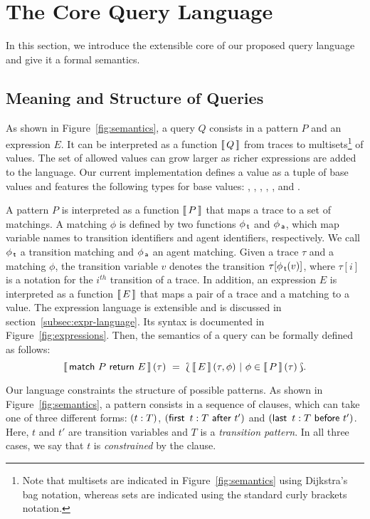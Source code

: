 \documentclass[runningheads]{llncs}
\begin{document}

\section{The Core Query Language}\label{sec:semantics}

In this section, we introduce the extensible core of our proposed
query language and give it a formal semantics.

\subsection{Meaning and Structure of Queries}\label{subsec:structure}
As shown in Figure~\ref{fig:semantics}, a query $Q$ consists in a
pattern $P$ and an expression $E$. It can be interpreted as a function
$\left\llbracket \, Q \, \right\rrbracket$ from traces to multisets\footnote{Note that multisets are
  indicated in Figure~\ref{fig:semantics} using Dijkstra's bag
  notation, whereas sets are indicated using the standard curly
  brackets notation.} of values. The set of allowed values can grow
larger as richer expressions are added to the language. Our current
implementation defines a value as a tuple of base values and features
the following types for base values: , , ,
, ,  and .

A pattern $P$ is interpreted as a function $\left\llbracket \, P \, \right\rrbracket$ that maps a trace
to a set of matchings. A matching $\phi$ is defined by two functions
$\phi_{\,\textsf{t}}$ and $\phi_{\,\textsf{a}}$, which map variable names to transition
identifiers and agent identifiers, respectively. We call $\phi_{\,\textsf{t}}$
a transition matching and $\phi_{\,\textsf{a}}$ an agent matching.  Given a
trace $\tau$ and a matching $\phi$, the transition variable $v$
denotes the transition $\tau[\phi_{\,\textsf{t}}(v)]$, where $\tau[i]$ is a
notation for the $i^{th}$ transition of a trace. In addition, an
expression $E$ is interpreted as a function $\left\llbracket \, E \, \right\rrbracket$ that maps a pair
of a trace and a matching to a value. The expression language is
extensible and is discussed in section~\ref{subsec:expr-language}. Its
syntax is documented in Figure~\ref{fig:expressions}. Then, the
semantics of a query can be formally defined as follows:
\[ \Sem{\MatchRet{\TracePat}{E}}(\tau) \ = \ \BagC{\Sem{E}(\tau,
    \phi)}{\phi \in \Sem{\TracePat}(\tau) }.  \]

Our language constraints the structure of possible patterns.  As shown
in Figure~\ref{fig:semantics}, a pattern consists in a sequence of
clauses, which can take one of three different forms: $(t:T)$,
$(\textsf{first} \,\ t:T \ \textsf{after} \ t')$ and
$(\textsf{last} \,\ t:T \ \textsf{before} \ t')$. Here, $t$ and $t'$ are transition
variables and $T$ is a \emph{transition pattern}. In all three cases,
we say that $t$ is \emph{constrained} by the clause.
\end{document}
